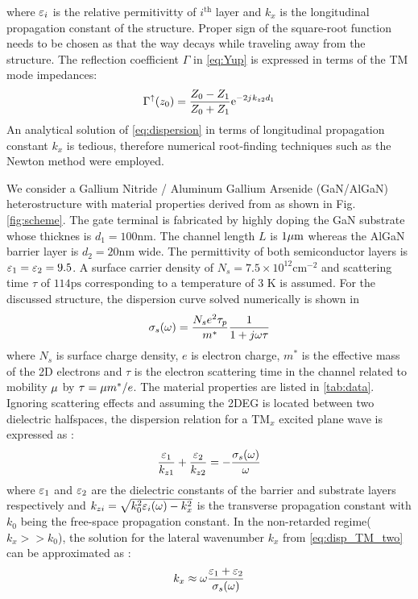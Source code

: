 \documentclass[11pt]{article}
\begin{document}
%
where $\varepsilon_i$ is the relative permitivitty of $i^{\text{th}}$ layer and $k_x$ is the longitudinal propagation constant of the structure. Proper sign of the square-root function needs to be chosen as that the way decays while traveling away from the structure. The reflection coefficient $\Gamma$ in \eqref{eq:Yup} is expressed in terms of the TM mode impedances:
%
\begin{equation}
  \Gamma^{\uparrow}(z_0) = \frac{Z_0 - Z_1}{Z_0 + Z_1} \mathrm{e}^{-2j\mkern1mu k_{z2}d_1}
  \label{eq:Gamma}
\end{equation}
%
An analytical solution of \eqref{eq:dispersion} in terms of longitudinal propagation constant $k_x$ is tedious, therefore numerical root-finding techniques such as the Newton method were employed.

We consider a Gallium Nitride / Aluminum Gallium Arsenide (GaN/AlGaN) heterostructure with material properties derived from \cite{Muravjov_2010} as shown in Fig. \ref{fig:scheme}. The gate terminal is fabricated by highly doping the GaN substrate whose thicknes is $d_1 = 100 \mathrm{nm}$. The channel length $L$ is $1 \mathrm{\mu m}$ whereas the AlGaN barrier layer is $d_2 = 20 \mathrm{nm}$ wide. The permittivity of both semiconductor layers is $\varepsilon_1 = \varepsilon_2 = 9.5$. A surface carrier density of $N_s = 7.5 \times 10^{12} \mathrm{cm}^{-2}$ and scattering time $\tau$ of $114 \mathrm{ps}$ corresponding to a temperature of $3$ K is assumed. For the discussed structure, the dispersion curve solved numerically is shown in
\begin{equation}
  \sigma_s(\omega) = \frac{N_s e^2 \tau_{p}}{m^{\ast}}\frac{1}{1 + j \omega \tau}
  \label{eq:conductivity}
\end{equation}
%
where $N_s$ is surface charge density, $e$ is electron charge, $m^{\ast}$ is the effective mass of the 2D electrons and $\tau$ is the electron scattering time in the channel related to mobility $\mu$ by $\tau = \mu m^{\ast}/e$. The material properties are listed in \ref{tab:data}. Ignoring scattering effects and assuming the 2DEG is located between two dielectric halfspaces, the dispersion relation for a $\mathrm{TM}_x$ excited plane wave is expressed as \cite{Nakayama_1974}:
%
\begin{equation}
  \frac{\varepsilon_1}{k_{z1}} + \frac{\varepsilon_2}{k_{z2}} = -\frac{\sigma_s(\omega)}{\omega}
  \label{eq:disp_TM_two}
\end{equation}
%
where $\varepsilon_1$ and $\varepsilon_2$ are the dielectric constants of the barrier and substrate layers respectively and $k_{zi} = \sqrt{k_0^2 \varepsilon_i(\omega) -  k_x^2}$ is the transverse propagation constant with $k_0$ being the free-space propagation constant. In the non-retarded regime($k_x >> k_0$), the solution for the lateral wavenumber $k_x$ from \eqref{eq:disp_TM_two} can be approximated as \cite{Jablan_2009}:
%
\begin{equation}
  k_x \approx \omega \frac{\varepsilon_1 + \varepsilon_2}{\sigma_s(\omega)}
  \label{eq:disl_sol}
\end{equation}
%
\end{document}
